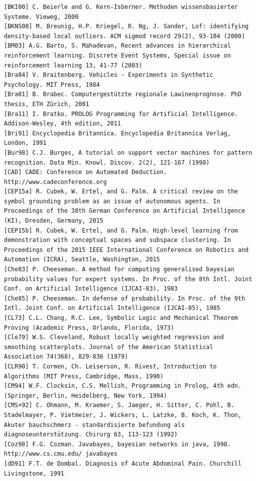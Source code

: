 \documentclass[10pt]{book}
\begin{document}
\begin{center}
\begin{enumerate}
\begin{center}
\begin{center}
\begin{center}
\begin{center}
\begin{center}
\begin{verbatim}
[BKI00] C. Beierle and G. Kern-Isberner. Methoden wissensbasierter Systeme. Vieweg, 2000
[BKNS00] M. Breunig, H.P. Kriegel, R. Ng, J. Sander, Lof: identifying density-based local outliers. ACM sigmod record 29(2), 93-104 (2000)
[BM03] A.G. Barto, S. Mahadevan, Recent advances in hierarchical reinforcement learning. Discrete Event Systems, Special issue on reinforcement learning 13, 41-77 (2003)
[Bra84] V. Braitenberg. Vehicles - Experiments in Synthetic Psychology. MIT Press, 1984
[Bra01] B. Brabec. Computergestützte regionale Lawinenprognose. PhD thesis, ETH Zürich, 2001
[Bra11] I. Bratko. PROLOG Programming for Artificial Intelligence. Addison-Wesley, 4th edition, 2011
[Bri91] Encyclopedia Britannica. Encyclopedia Britannica Verlag, London, 1991
[Bur98] C.J. Burges, A tutorial on support vector machines for pattern recognition. Data Min. Knowl. Discov. 2(2), 121-167 (1998)
[CAD] CADE: Conference on Automated Deduction. http://www.cadeconference.org
[CEP15a] R. Cubek, W. Ertel, and G. Palm. A critical review on the symbol grounding problem as an issue of autonomous agents. In Proceedings of the 38th German Conference on Artificial Intelligence (KI), Dresden, Germany, 2015
[CEP15b] R. Cubek, W. Ertel, and G. Palm. High-level learning from demonstration with conceptual spaces and subspace clustering. In Proceedings of the 2015 IEEE International Conference on Robotics and Automation (ICRA), Seattle, Washington, 2015
[Che83] P. Cheeseman. A method for computing generalised bayesian probability values for expert systems. In Proc. of the 8th Intl. Joint Conf. on Artificial Intelligence (IJCAI-83), 1983
[Che85] P. Cheeseman. In defense of probability. In Proc. of the 9th Intl. Joint Conf. on Artificial Intelligence (IJCAI-85), 1985
[CL73] C.L. Chang, R.C. Lee, Symbolic Logic and Mechanical Theorem Proving (Academic Press, Orlando, Florida, 1973)
[Cle79] W.S. Cleveland, Robust locally weighted regression and smoothing scatterplots. Journal of the American Statistical Association 74(368), 829-836 (1979)
[CLR90] T. Cormen, Ch. Leiserson, R. Rivest, Introduction to Algorithms (MIT Press, Cambridge, Mass, 1990)
[CM94] W.F. Clocksin, C.S. Mellish, Programming in Prolog, 4th edn. (Springer, Berlin, Heidelberg, New York, 1994)
[CMS+92] C. Ohmann, M. Kraemer, S. Jaeger, H. Sitter, C. Pohl, B. Stadelmayer, P. Vietmeier, J. Wickers, L. Latzke, B. Koch, K. Thon, Akuter bauchschmerz - standardisierte befundung als diagnoseunterstützung. Chirurg 63, 113-123 (1992)
[Coz98] F.G. Cozman. Javabayes, bayesian networks in java, 1998. http://www.cs.cmu.edu/ javabayes
[dD91] F.T. de Dombal. Diagnosis of Acute Abdominal Pain. Churchill Livingstone, 1991

\end{verbatim}
\end{center}
\end{center}
\end{center}
\end{center}
\end{center}
\end{enumerate}
\end{center}
\end{document}
